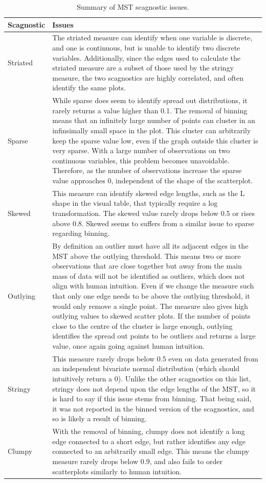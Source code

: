 \begin{table}

\caption{\label{tab:scagissues-tb-pdf}Summary of MST scagnostic issues.}
\centering
\begin{tabular}[t]{l>{\raggedright\arraybackslash}p{12cm}}
\toprule
Scagnostic & Issues\\
\midrule
Striated & The striated measure can identify when one variable is discrete, and one is continuous, but is unable to identify two discrete variables. Additionally, since the edges used to calculate the striated measure are a subset of those used by the stringy measure, the two scagnostics are highly correlated, and often identify the same plots.\\
Sparse & While sparse does seem to identify spread out distributions, it rarely returns a value higher than 0.1. The removal of binning means that an infinitely large number of points can cluster in an infinsimally small space in the plot. This cluster can arbitrarily keep the sparse value low, even if the graph outside this cluster is very sparse. With a large number of observations on two continuous variables, this problem becomes unavoidable. Therefore, as the number of observations increase the sparse value approaches 0, independent of the shape of the scatterplot.\\
Skewed & This measure can identify skewed edge lengths, such as the L shape in the visual table, that typically require a log transformation. The skewed value rarely drops below 0.5 or rises above 0.8. Skewed seems to suffers from a similar issue to sparse regarding binning.\\
Outlying & By definition an outlier must have all its adjacent edges in the MST above the outlying threshold. This means two or more observations that are close together but away from the main mass of data will not be identified as outliers, which does not align with human intuition. Even if we change the measure such that only one edge needs to be above the outlying threshold, it would only remove a single point. The measure also gives high outlying values to skewed scatter plots.  If the number of points close to the centre of the cluster is large enough, outlying identifies the spread out points to be outliers and returns a large value, once again going against human intuition.\\
Stringy & This measure rarely drops below 0.5 even on data generated from an independent bivariate normal distribution (which should intuitively return a 0). Unlike the other scagnostics on this list, stringy does not depend upon the edge lengths of the MST, so it is hard to say if this issue stems from binning. That being said, it was not reported in the binned version of the scagnostics, and so is likely a result of binning.\\
\addlinespace
Clumpy & With the removal of binning, clumpy does not identify a long edge connected to a short edge, but rather identifies any edge connected to an arbitrarily small edge. This means the clumpy measure rarely drops below 0.9, and also fails to order scatterplots similarly to human intuition.\\
\bottomrule
\end{tabular}
\end{table}

